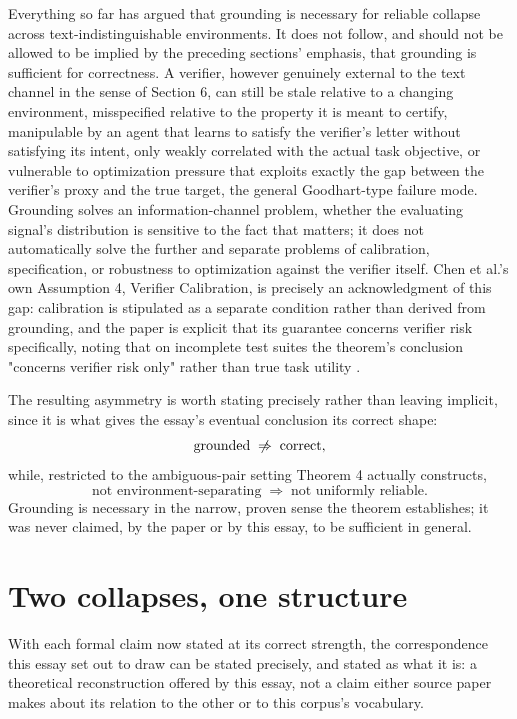\documentclass[11pt]{article}
\begin{document}
Everything so far has argued that grounding is necessary for reliable collapse across text-indistinguishable environments. It does not follow, and should not be allowed to be implied by the preceding sections' emphasis, that grounding is sufficient for correctness. A verifier, however genuinely external to the text channel in the sense of Section 6, can still be stale relative to a changing environment, misspecified relative to the property it is meant to certify, manipulable by an agent that learns to satisfy the verifier's letter without satisfying its intent, only weakly correlated with the actual task objective, or vulnerable to optimization pressure that exploits exactly the gap between the verifier's proxy and the true target, the general Goodhart-type failure mode. Grounding solves an information-channel problem, whether the evaluating signal's distribution is sensitive to the fact that matters; it does not automatically solve the further and separate problems of calibration, specification, or robustness to optimization against the verifier itself. Chen et al.'s own Assumption 4, Verifier Calibration, is precisely an acknowledgment of this gap: calibration is stipulated as a separate condition rather than derived from grounding, and the paper is explicit that its guarantee concerns verifier risk specifically, noting that on incomplete test suites the theorem's conclusion "concerns verifier risk only" rather than true task utility \cite{chen2026bilevel}.

The resulting asymmetry is worth stating precisely rather than leaving implicit, since it is what gives the essay's eventual conclusion its correct shape:
$$\text{grounded} \;\centernot\Rightarrow\; \text{correct},$$
while, restricted to the ambiguous-pair setting Theorem 4 actually constructs,
$$\text{not environment-separating} \;\Rightarrow\; \text{not uniformly reliable}.$$
Grounding is necessary in the narrow, proven sense the theorem establishes; it was never claimed, by the paper or by this essay, to be sufficient in general.

\section{Two collapses, one structure}

With each formal claim now stated at its correct strength, the correspondence this essay set out to draw can be stated precisely, and stated as what it is: a theoretical reconstruction offered by this essay, not a claim either source paper makes about its relation to the other or to this corpus's vocabulary.
\end{document}
